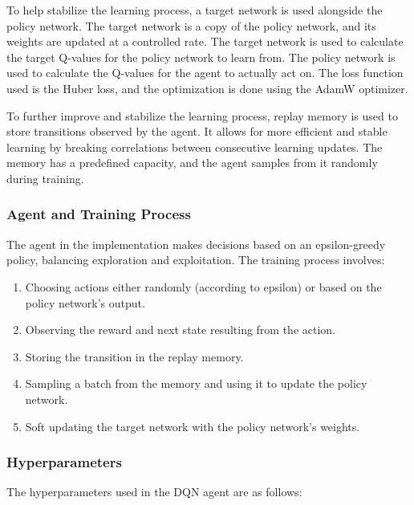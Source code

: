 \documentclass[12pt]{article}
\begin{document}
\noindent
To help stabilize the learning process, a target network is used alongside the policy network. The target network is a copy of the policy network, and its weights are updated at a controlled rate. The target network is used to calculate the target Q-values for the policy network to learn from. The policy network is used to calculate the Q-values for the agent to actually act on. The loss function used is the Huber loss, and the optimization is done using the AdamW optimizer.

To further improve and stabilize the learning process, replay memory is used to store transitions observed by the agent. It allows for more efficient and stable learning by breaking correlations between consecutive learning updates. The memory has a predefined capacity, and the agent samples from it randomly during training.

\subsubsection{Agent and Training Process}
The agent in the implementation makes decisions based on an epsilon-greedy policy, balancing exploration and exploitation. The training process involves:
\begin{enumerate}
    \item Choosing actions either randomly (according to epsilon) or based on the policy network's output.
    \item Observing the reward and next state resulting from the action.
    \item Storing the transition in the replay memory.
    \item Sampling a batch from the memory and using it to update the policy network.
    \item Soft updating the target network with the policy network's weights.
\end{enumerate}

\noindent

\subsubsection{Hyperparameters}
The hyperparameters used in the DQN agent are as follows:
\end{document}
